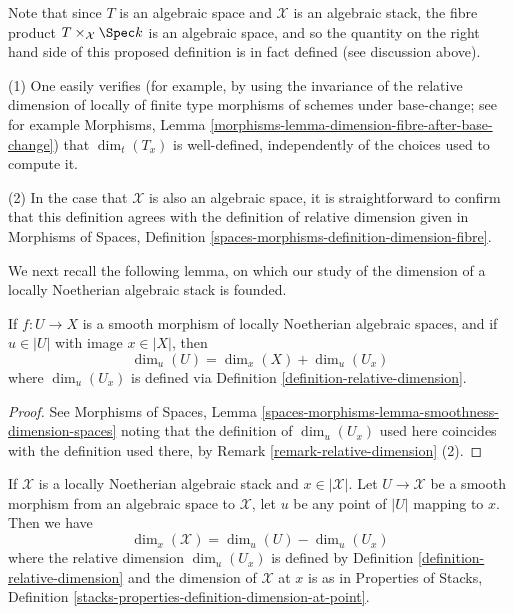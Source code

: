 \noindent
Note that since $T$ is an algebraic space and $\mathcal{X}$ is an
algebraic stack, the fibre product $T \times_{\mathcal{X}} \Spec k$
is an algebraic space, and so the quantity on the right hand side of
this proposed definition is in fact defined (see discussion above).

\begin{remark}
\label{remark-relative-dimension}
(1)
One easily verifies (for example, by using the invariance
of the relative dimension of locally of finite type morphisms of schemes
under base-change; see for example
Morphisms, Lemma \ref{morphisms-lemma-dimension-fibre-after-base-change})
that $\dim_t(T_x)$ is well-defined, independently of the choices
used to compute it.

\medskip\noindent
(2)
In the case that $\mathcal{X}$ is also an algebraic space,
it is straightforward to confirm that this definition agrees with
the definition of relative dimension given in
Morphisms of Spaces, Definition
\ref{spaces-morphisms-definition-dimension-fibre}.
\end{remark}

\noindent
We next recall the following lemma, on which our study of
the dimension of a locally Noetherian algebraic stack is founded.

\begin{lemma}
\label{lemma-behaviour-of-dimensions-wrt-smooth-morphisms}
If $f: U \to X$ is a smooth morphism of locally Noetherian algebraic
spaces, and
if $u \in |U|$ with image $x \in |X|$, then
$$
\dim_u (U) = \dim_x(X) + \dim_{u} (U_x)
$$
where $\dim_u (U_x)$ is defined via
Definition \ref{definition-relative-dimension}.
\end{lemma}

\begin{proof}
See Morphisms of Spaces, Lemma
\ref{spaces-morphisms-lemma-smoothness-dimension-spaces}
noting that the definition of $\dim_u (U_x)$ used here coincides with
the definition used there, by Remark \ref{remark-relative-dimension} (2).
\end{proof}

\begin{lemma}
\label{lemma-dimension-for-stacks}
If $\mathcal{X}$ is a locally Noetherian algebraic stack and
$x \in |\mathcal{X}|$. Let $U \to \mathcal{X}$ be a smooth morphism
from an algebraic space to $\mathcal{X}$, let $u$ be any point of $|U|$
mapping to $x$. Then we have
$$
\dim_x(\mathcal{X}) =  \dim_u(U) - \dim_{u}(U_x)
$$
where the relative dimension $\dim_u(U_x)$ is defined
by Definition \ref{definition-relative-dimension} and the
dimension of $\mathcal{X}$ at $x$ is as in
Properties of Stacks, Definition
\ref{stacks-properties-definition-dimension-at-point}.
\end{lemma}

